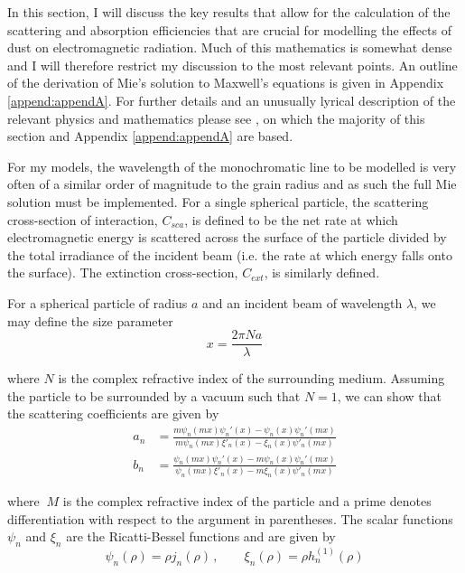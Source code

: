 In this section, I will discuss the key results that allow for the calculation of the scattering and absorption efficiencies that are crucial for modelling the effects of dust on electromagnetic radiation.  Much of this mathematics is somewhat dense and I will therefore restrict my discussion to the most relevant points. An outline of the derivation of  Mie's solution to Maxwell's equations is given in Appendix \ref{append:appendA}.  For further details and an unusually lyrical description of the relevant physics and mathematics please see \citet{Bohren1983}, on which the majority of this section and Appendix \ref{append:appendA} are based.  

For my models, the wavelength of the monochromatic line to be modelled is very often of a similar order of magnitude to the grain radius and as such the full Mie solution must be implemented.  %
For a single spherical particle, the scattering cross-section of interaction, $C_{sca}$, is defined to be the net rate at which electromagnetic energy is scattered across the surface of the particle divided by the total irradiance of the incident beam (i.e. the rate at which energy falls onto the surface).  The extinction cross-section, $C_{ext}$, is similarly defined.  

For a spherical particle of radius $a$ and an incident beam of wavelength $\lambda$, we may define the size parameter
\begin{equation}
x=\frac{2\pi N a}{\lambda}
\end{equation}

\noindent where $N$ is the complex refractive index of the surrounding medium.  Assuming the particle to be surrounded by a vacuum such that $N=1$, we can show that the scattering coefficients are given by 
\begin{align}
a_n &= \frac{m\psi_n(mx)\psi_n'(x)-\psi_n(x)\psi_n'(mx)}{m\psi_n(mx)\xi'_n(x)-\xi_n(x)\psi'_n(mx)} \\[2ex]
b_n &= \frac{\psi_n(mx)\psi_n'(x)-m\psi_n(x)\psi_n'(mx)}{\psi_n(mx)\xi'_n(x)-m\xi_n(x)\psi'_n(mx)}
\end{align}


\noindent where $~M$ is the complex refractive index of the particle and a prime denotes differentiation with respect to the argument in parentheses. The scalar functions $\psi_n$ and $\xi_n$ are the Ricatti-Bessel functions and are given by
\begin{equation}
\psi_n(\rho) = \rho j_n(\rho) \, , \quad \quad \xi_n(\rho)=\rho h_n^{(1)}(\rho)
\end{equation}

